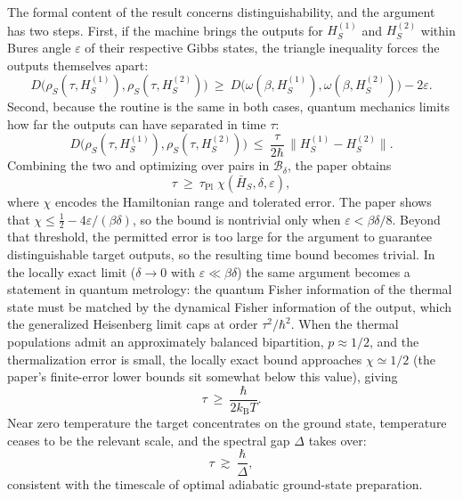 \documentclass[11pt]{article}
\theoremstyle{definition}
\newcommand{\Ball}{\mathcal B}
\begin{document}
The formal content of the result concerns distinguishability, and the argument has two steps. First, if the machine brings the outputs for $H_S^{(1)}$ and $H_S^{(2)}$ within Bures angle $\varepsilon$ of their respective Gibbs states, the triangle inequality forces the outputs themselves apart:
\begin{equation}
D\big(\rho_S(\tau,H_S^{(1)}),\rho_S(\tau,H_S^{(2)})\big)\ \ge\ D\big(\omega(\beta,H_S^{(1)}),\omega(\beta,H_S^{(2)})\big)-2\varepsilon .
\end{equation}
Second, because the routine is the same in both cases, quantum mechanics limits how far the outputs can have separated in time $\tau$:
\begin{equation}
D\big(\rho_S(\tau,H_S^{(1)}),\rho_S(\tau,H_S^{(2)})\big)\ \le\ \frac{\tau}{2\hbar}\,\big\|H_S^{(1)}-H_S^{(2)}\big\| .
\end{equation}
Combining the two and optimizing over pairs in $\Ball_\delta$, the paper obtains
\begin{equation}
\tau\ \ge\ \tau_{\mathrm{Pl}}\;\chi(\bar H_S,\delta,\varepsilon),
\end{equation}
where $\chi$ encodes the Hamiltonian range and tolerated error. The paper shows that $\chi\le\tfrac12-4\varepsilon/(\beta\delta)$, so the bound is nontrivial only when $\varepsilon<\beta\delta/8$. Beyond that threshold, the permitted error is too large for the argument to guarantee distinguishable target outputs, so the resulting time bound becomes trivial. In the locally exact limit ($\delta\to 0$ with $\varepsilon\ll\beta\delta$) the same argument becomes a statement in quantum metrology: the quantum Fisher information of the thermal state must be matched by the dynamical Fisher information of the output, which the generalized Heisenberg limit caps at order $\tau^2/\hbar^2$. When the thermal populations admit an approximately balanced bipartition, $p\approx 1/2$, and the thermalization error is small, the locally exact bound approaches $\chi\simeq 1/2$ (the paper's finite-error lower bounds sit somewhat below this value), giving
\begin{equation}
\tau\ \ge\ \frac{\hbar}{2k_{\mathrm B}T}.
\end{equation}
Near zero temperature the target concentrates on the ground state, temperature ceases to be the relevant scale, and the spectral gap $\Delta$ takes over:
\begin{equation}
\tau\ \gtrsim\ \frac{\hbar}{\Delta},
\end{equation}
consistent with the timescale of optimal adiabatic ground-state preparation.
\end{document}

